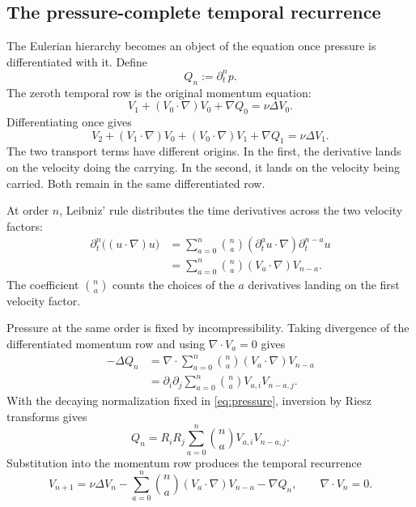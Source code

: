 \subsection{The pressure-complete temporal recurrence}

The Eulerian hierarchy becomes an object of the equation once pressure is
differentiated with it.  Define
\begin{equation*}
 Q_n:=\partial_t^np.
\end{equation*}
The zeroth temporal row is the original momentum equation:
\begin{equation*}
 V_1+(V_0\cdot\nabla)V_0+\nabla Q_0
 =\nu\Delta V_0.
\end{equation*}
Differentiating once gives
\begin{equation*}
 V_2
 +(V_1\cdot\nabla)V_0
 +(V_0\cdot\nabla)V_1
 +\nabla Q_1
 =\nu\Delta V_1.
\end{equation*}
The two transport terms have different origins.  In the first, the derivative
lands on the velocity doing the carrying.  In the second, it lands on the
velocity being carried.  Both remain in the same differentiated row.

At order \(n\), Leibniz' rule distributes the time derivatives across the two
velocity factors:
\begin{align*}
 \partial_t^n\bigl((u\cdot\nabla)u\bigr)
 &=\sum_{a=0}^n\binom na
   (\partial_t^au\cdot\nabla)\partial_t^{n-a}u
 \\
 &=\sum_{a=0}^n\binom na
   (V_a\cdot\nabla)V_{n-a}.
\end{align*}
The coefficient \(\binom na\) counts the choices of the \(a\) derivatives
landing on the first velocity factor.

Pressure at the same order is fixed by incompressibility.  Taking divergence
of the differentiated momentum row and using
\(\nabla\cdot V_a=0\) gives
\begin{align*}
 -\Delta Q_n
 &=\nabla\cdot
   \sum_{a=0}^n\binom na(V_a\cdot\nabla)V_{n-a}
 \\
 &=\partial_i\partial_j
   \sum_{a=0}^n\binom naV_{a,i}V_{n-a,j}.
\end{align*}
With the decaying normalization fixed in \eqref{eq:pressure}, inversion by
Riesz transforms gives
\begin{equation}
 Q_n
 =R_iR_j\sum_{a=0}^n\binom naV_{a,i}V_{n-a,j}.
 \label{eq:pressure-time-jet}
\end{equation}
Substitution into the momentum row produces the temporal recurrence
\begin{equation}
 V_{n+1}
 =\nu\Delta V_n
 -\sum_{a=0}^n\binom na(V_a\cdot\nabla)V_{n-a}
 -\nabla Q_n,
 \qquad
 \nabla\cdot V_n=0.
 \label{eq:velocity-time-jet}
\end{equation}


